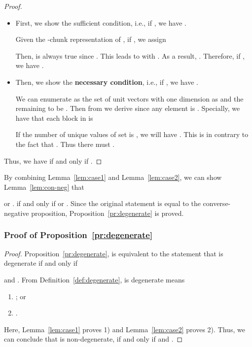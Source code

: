 \documentclass[10pt,journal,compsoc]{IEEEtran}
\begin{document}
\begin{proof}
	\begin{itemize}[leftmargin=*]
		\item First, we show the sufficient condition, i.e.,
		if ,
		we have .
		
		Given the -chunk representation of ,
		if    ,
		we assign 
			
		Then,
		 is always true 
		since .
		This leads to 
		with .
		As a result,
		.
		Therefore,
		if ,
		we have .
		
		\item Then, we show the \textbf{necessary condition}, i.e.,
		if ,
		we have .
		
		We can enumerate 
		as the set of unit vectors with one dimension as 
		and the remaining to be .
		Then from 
		we derive 
		since any element is .
		Specially,
		we have that each block in  is
		
		If the number of unique values of set  is ,
		we will have .
		This is in contrary to the fact that
		.
		Thus there must 
		.
		

	\end{itemize}
\noindent
Thus, 
we have 
if and only if 
.
\end{proof}

By combining Lemma~\ref{lem:case1} and Lemma~\ref{lem:case2},
we can show Lemma~\ref{lem:con-neg} that

or 
.
if and only if
 or .
Since
the original statement is equal to the converse-negative proposition,
Proposition~\ref{pr:degenerate} is proved.


\subsubsection{Proof of Proposition~\ref{pr:degenerate}}

\begin{proof}
Proposition~\ref{pr:degenerate},
is equivalent to the statement that
 is degenerate if and only if 

and .
From Definition~\ref{def:degenerate},
 is degenerate means
\begin{enumerate}[leftmargin=*]
	\item ; or
	\item .
\end{enumerate}
Here, 
Lemma~\ref{lem:case1} proves 1) and Lemma~\ref{lem:case2} proves 2).
Thus,
we can conclude that
 is non-degenerate,
if and only if 
and 
.
\end{proof}
\end{document}
